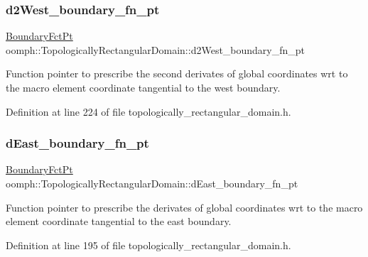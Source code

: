 \subsubsection{\texorpdfstring{d2\+West\+\_\+boundary\+\_\+fn\+\_\+pt}{d2West\_boundary\_fn\_pt}}
{\footnotesize\ttfamily \hyperlink{classoomph_1_1TopologicallyRectangularDomain_a8b2e24f5500d86c93aef509c5410e7cc}{Boundary\+Fct\+Pt} oomph\+::\+Topologically\+Rectangular\+Domain\+::d2\+West\+\_\+boundary\+\_\+fn\+\_\+pt\hspace{0.3cm}{\ttfamily [private]}}



Function pointer to prescribe the second derivates of global coordinates wrt to the macro element coordinate tangential to the west boundary. 



Definition at line 224 of file topologically\+\_\+rectangular\+\_\+domain.\+h.

\mbox{\label{classoomph_1_1TopologicallyRectangularDomain_a535ff2d7f9561425d9fd4b0d57bbc769}} 
\subsubsection{\texorpdfstring{d\+East\+\_\+boundary\+\_\+fn\+\_\+pt}{dEast\_boundary\_fn\_pt}}
{\footnotesize\ttfamily \hyperlink{classoomph_1_1TopologicallyRectangularDomain_a8b2e24f5500d86c93aef509c5410e7cc}{Boundary\+Fct\+Pt} oomph\+::\+Topologically\+Rectangular\+Domain\+::d\+East\+\_\+boundary\+\_\+fn\+\_\+pt\hspace{0.3cm}{\ttfamily [private]}}



Function pointer to prescribe the derivates of global coordinates wrt to the macro element coordinate tangential to the east boundary. 



Definition at line 195 of file topologically\+\_\+rectangular\+\_\+domain.\+h.

\mbox{\label{classoomph_1_1TopologicallyRectangularDomain_afda00e0273ae8dacbd3626bfd363fcc3}} 
